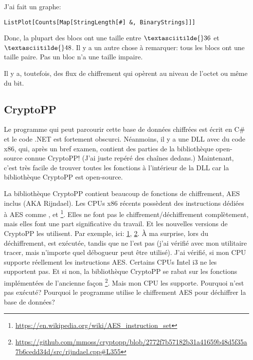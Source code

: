 J'ai fait un graphe:

\begin{lstlisting}
ListPlot[Counts[Map[StringLength[#] &, BinaryStrings]]]
\end{lstlisting}

\begin{figure}[H]
\centering
{}
\end{figure}

Donc, la plupart des blocs ont une taille entre $\textasciitilde{}36$ et $\textasciitilde{}48$.
Il y a un autre chose à remarquer: tous les blocs ont une taille paire.
Pas un bloc n'a une taille impaire.

Il y a, toutefois, des flux de chiffrement qui opèrent au niveau de l'octet ou même
du bit.

\subsection{CryptoPP}

Le programme qui peut parcourir cette base de données chiffrées est écrit en C\#
et le code .NET est fortement obscurci.
Néanmoins, il y a une DLL avec du code x86, qui, après un bref examen, contient des
parties de la bibliothèque open-source connue CryptoPP!
(J'ai juste repéré des chaînes  dedans.)
Maintenant, c'est très facile de trouver toutes les fonctions à l'intérieur de la
DLL car la bibliothèque CryptoPP est open-source.

La bibliothèque CryptoPP contient beaucoup de fonctions de chiffrement, AES inclus (AKA Rijndael).
Les CPUs x86 récents possèdent des instructions dédiées à AES comme , 
et \footnote{\url{https://en.wikipedia.org/wiki/AES_instruction_set}}.
Elles ne font pas le chiffrement/déchiffrement complètement, mais elles font une
part significative du travail.
Et les nouvelles versions de CryptoPP les utilisent.
Par exemple, ici:
\href{https://github.com/mmoss/cryptopp/blob/2772f7b57182b31a41659b48d5f35a7b6cedd34d/src/rijndael.cpp#L1034}{1},
\href{https://github.com/mmoss/cryptopp/blob/2772f7b57182b31a41659b48d5f35a7b6cedd34d/src/rijndael.cpp#L1000}{2}.
À ma surprise, lors du déchiffrement,  est exécutée, tandis que 
ne l'est pas (j'ai vérifié avec mon utilitaire tracer, mais n'importe quel débogueur
peut être utilisé).
J'ai vérifié, si mon CPU supporte réellement les instructions AES. Certains CPUs
Intel i3 ne les supportent pas.
Et si non, la bibliothèque CryptoPP se rabat sur les fonctions implémentées de l'ancienne façon
\footnote{\url{https://github.com/mmoss/cryptopp/blob/2772f7b57182b31a41659b48d5f35a7b6cedd34d/src/rijndael.cpp#L355}}.
Mais mon CPU les supporte.
Pourquoi  n'est pas exécuté?
Pourquoi le programme utilise le chiffrement AES pour déchiffrer la base de données?

